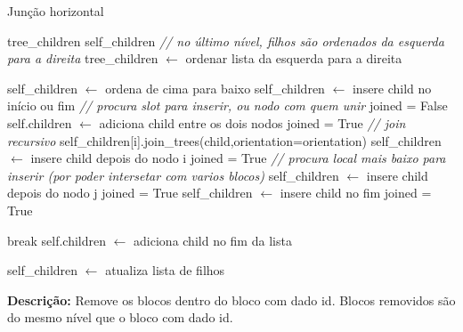 \begin{algorithm}[H]
	\caption{Junção horizontal}
	\tiny
	\begin{algorithmic}[1]
		\STATE tree\_children
		\STATE self\_children
		\STATE \textit{// no último nível, filhos são ordenados da esquerda para a direita}
			\STATE tree\_children $\leftarrow$ ordenar lista da esquerda para a direita
		\ENDIF
		
				\STATE self\_children $\leftarrow$ ordena de cima para baixo
					\STATE self\_children $\leftarrow$ insere child no início ou fim
				\ELSE
					\STATE \textit{// procura slot para inserir, ou nodo com quem unir}
					\STATE joined = False
							\STATE self.children $\leftarrow$ adiciona child entre os dois nodos
							\STATE joined = True
									\STATE \textit{// join recursivo}
									\STATE self\_children[i].join\_trees(child,orientation=orientation)
								\ELSE
									\STATE self\_children $\leftarrow$ insere child depois do nodo i
								\ENDIF
								\STATE joined = True
							\ELSE
								\STATE \textit{// procura local mais baixo para inserir (por poder intersetar com varios blocos)}
										\STATE self\_children $\leftarrow$ insere child depois do nodo j
										\STATE joined = True
									\ENDIF
								\ENDFOR
									\STATE self\_children $\leftarrow$ insere child no fim
									\STATE joined = True
								\ENDIF
							\ENDIF
						\ENDIF
						
							\STATE break
						\ENDIF
					\ENDFOR
				\ENDIF
			\ELSE
				\STATE self.children $\leftarrow$ adiciona child no fim da lista
			\ENDIF
			
			\STATE self\_children $\leftarrow$ atualiza lista de filhos
		\ENDFOR
		
		
	\end{algorithmic}
\end{algorithm}



\textbf{Descrição:} Remove os blocos dentro do bloco com dado id. Blocos removidos são do mesmo nível que o bloco com dado id.



